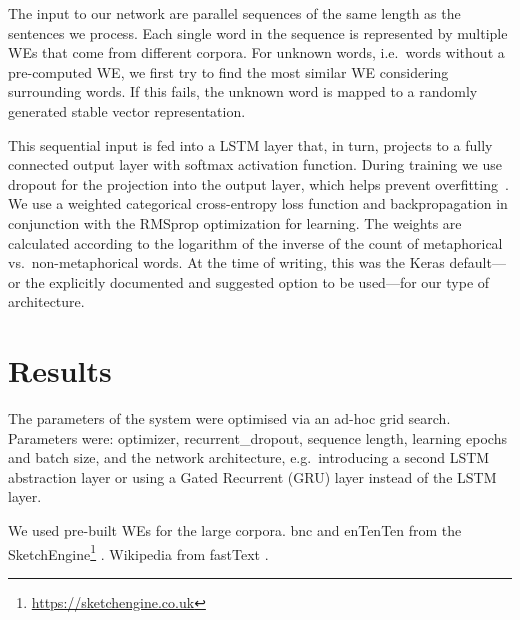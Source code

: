 \documentclass[11pt,a4paper]{article}
\begin{document}
The input to our network are parallel sequences of the same length as the sentences we
process.
Each single word in the sequence is represented by multiple WEs that come from different corpora. %
For unknown words, i.e.~words without a pre-computed WE, we first try to
find the most similar WE considering %
surrounding words.  
If this fails, the unknown word is mapped to a randomly generated stable vector
representation.

This sequential input is fed into a LSTM layer that, in turn, projects to a
fully connected output layer with softmax activation function.
During training we use dropout for the projection into the output layer,
which helps prevent overfitting~\cite{Srivastava2014}.
We use a weighted categorical cross-entropy loss function and backpropagation in
conjunction with the RMSprop optimization for learning.  The weights are calculated according to the logarithm of the inverse of the count of metaphorical vs.~non-metaphorical words.
At the time of writing, this was the Keras default---or the explicitly
documented and suggested option to be used---for our type of architecture. 


\section{Results} %
\label{sec:results}

The parameters of the system were optimised via an ad-hoc grid search. Parameters were:
optimizer, recurrent\_dropout, sequence length, learning epochs and batch size, and the network architecture, e.g.~introducing a second LSTM abstraction layer or using a Gated Recurrent (GRU) layer instead of the LSTM layer.

We used pre-built WEs for the large corpora. bnc and enTenTen \cite{1120431} from the SketchEngine\footnote{\url{https://sketchengine.co.uk}} \cite{DBLP:journals/corr/BojanowskiGJM16}. Wikipedia from fastText \cite{mikolov2018advances}. 
\end{document}

